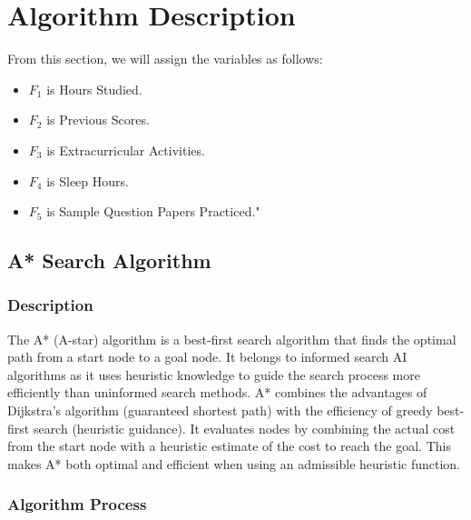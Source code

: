 \newpage

\section{Algorithm Description}
From this section, we will assign the variables as follows: 
\begin{itemize}
    \item $F_1$ is Hours Studied.
    \item $F_2$ is Previous Scores.
    \item $F_3$ is Extracurricular Activities.
    \item $F_4$ is Sleep Hours.
    \item $F_5$ is Sample Question Papers Practiced."
\end{itemize}

\subsection{A* Search Algorithm}

\subsubsection*{Description}
The A* (A-star) algorithm is a best-first search algorithm that finds the optimal path from a start node to a goal node. It belongs to informed search AI algorithms as it uses heuristic knowledge to guide the search process more efficiently than uninformed search methods. A* combines the advantages of Dijkstra's algorithm (guaranteed shortest path) with the efficiency of greedy best-first search (heuristic guidance). It evaluates nodes by combining the actual cost from the start node with a heuristic estimate of the cost to reach the goal. This makes A* both optimal and efficient when using an admissible heuristic function.\cite{hart1968formal}

\subsubsection*{Algorithm Process}


